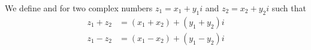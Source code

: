 \documentclass[a4]{scrreprt}
\begin{document}
\begin{definition}
	We define  and  for two complex numbers $z_1 = x_1 + y_1i$ and $z_2 = x_2 + y_2 i$ such that 
	\begin{align*}
		z_1 + z_2 &= (x_1 + x_2) + (y_1 + y_2)i\\
		z_1 - z_2 &= (x_1 - x_2) + (y_1 - y_2)i
	\end{align*}
\end{definition}


	

\end{document}
